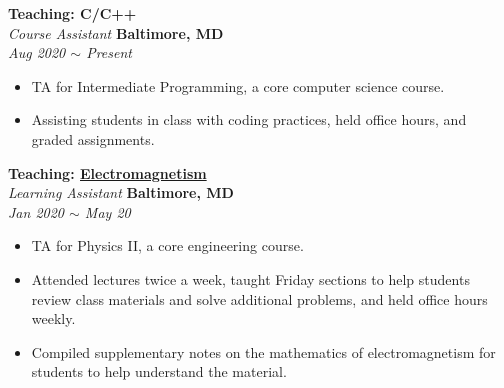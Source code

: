 \documentclass[10pt, letterpaper]{article}
\begin{document}
\begin{paracol}{2}
	\textbf{Teaching: C/C++}\\
	\textit{Course Assistant}
	\switchcolumn
	\raggedleft\textbf{Baltimore, MD}\\
	\raggedleft\textit{Aug 2020 $\sim$ Present}
\end{paracol}\vspace{-1mm}
\vspace{-2mm}
\begin{itemize}
	\item TA for Intermediate Programming, a core computer science course. 
	\vspace{-3mm}
	\item Assisting students in class with coding practices, held office hours, and graded assignments.
\end{itemize}
\vspace{-2mm}

\begin{paracol}{2}
	\textbf{Teaching: \href{https://github.com/chenyi00/physics-2}{Electromagnetism}}\\
	\textit{Learning Assistant}
	\switchcolumn
	\raggedleft\textbf{Baltimore, MD}\\
	\raggedleft\textit{Jan 2020 $\sim$ May 20}
\end{paracol}\vspace{-1mm}
\vspace{-2mm}
\begin{itemize}
	\item TA for Physics II, a core engineering course. \vspace{-3mm}
	\item Attended lectures twice a week, taught Friday sections to help students review class materials and solve additional problems, and held office hours weekly.
	\vspace{-3mm}
	\item Compiled supplementary notes on the mathematics of electromagnetism for students to help understand the material.
\end{itemize}
\vspace{-2mm}
\end{document}
